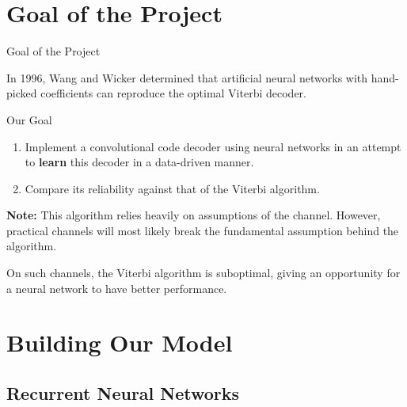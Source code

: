 \documentclass{beamer}
\newcommand{\<}				{\langle}
\renewcommand{\>}      		{\rangle}
\begin{document}
\section{Goal of the Project}

\begin{frame}{Goal of the Project}

In 1996, Wang and Wicker determined that artificial neural networks with hand-picked coefficients can reproduce the optimal Viterbi decoder.

\medskip

\begin{block}{Our Goal}
\begin{enumerate}
\item Implement a convolutional code decoder using neural networks in an attempt to \textbf{learn} this decoder in a data-driven manner. 
\item Compare its reliability against that of the Viterbi algorithm.
\end{enumerate}
\end{block}

\textbf{Note:} This algorithm relies heavily on assumptions of the channel. However, practical channels will most likely break the fundamental assumption behind the algorithm. 

\medskip

On such channels, the Viterbi algorithm is suboptimal, giving an opportunity for a neural network to have better performance.

\end{frame}

\section{Building Our Model} 

\subsection{Recurrent Neural Networks} 
\end{document}
